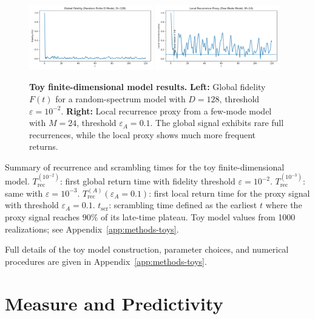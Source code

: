 \documentclass[12pt]{article}
\newcommand{\Trec}{T_{\mathrm{rec}}}
\newcommand{\TrecA}{T^{(A)}_{\mathrm{rec}}}
\newcommand{\tscr}{t_{\mathrm{scr}}}
\theoremstyle{remark}
\begin{document}
\begin{figure}[htbp]
    \centering
    \includegraphics[width=0.48\textwidth]{figs/fig_spin_fidelity.png}
    \includegraphics[width=0.48\textwidth]{figs/fig_spin_localrec.png}
    \caption{
\textbf{Toy finite-dimensional model results.} 
\textbf{Left:} Global fidelity $F(t)$ for a random-spectrum model with $D=128$, threshold $\varepsilon=10^{-2}$. 
\textbf{Right:} Local recurrence proxy from a few-mode model with $M=24$, threshold $\varepsilon_A=0.1$.
The global signal exhibits rare full recurrences, while the local proxy shows much more frequent returns.
    }
    \label{fig:toy_models}
\end{figure}

\begin{table}[htbp]
    \centering
    
    \caption{
Summary of recurrence and scrambling times for the toy finite-dimensional model.  
$\Trec^{(10^{-2})}$: first global return time with fidelity threshold $\varepsilon = 10^{-2}$.  
$\Trec^{(10^{-3})}$: same with $\varepsilon = 10^{-3}$.  
$\TrecA(\varepsilon_A=0.1)$: first local return time for the proxy signal with threshold $\varepsilon_A = 0.1$.  
$\tscr$: scrambling time defined as the earliest $t$ where the proxy signal reaches $90\%$ of its late-time plateau.
Toy model values from 1000 realizations; see Appendix~\ref{app:methods-toys}.
    }
    \label{tab:toy_summary}
\end{table}

Full details of the toy model construction, parameter choices, and numerical procedures are given in Appendix~\ref{app:methods-toys}.



\section{Measure and Predictivity}\label{sec:measure}
\end{document}
